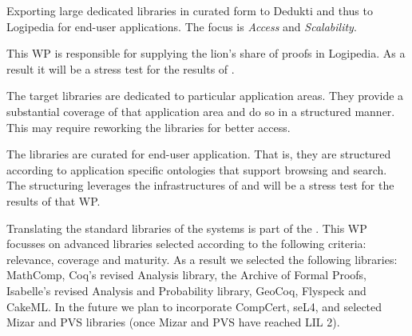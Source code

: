 \begin{workpackage}[id=libraries,type=RTD,wphases=1-48,
  short={Large libraries},%
  title={Large libraries},
  activity=na,
  lead=Tum,
  StrRM=18,
  ChaRM=12,
  TumRM=27]

\begin{wpobjectives}
Exporting large dedicated libraries in
curated form to Dedukti and thus to Logipedia for end-user applications.
The focus is \emph{Access} and \emph{Scalability}.
\begin{compactitem}
\item This WP is responsible for supplying the lion's share of proofs in
Logipedia.  As a result it will be a stress test for the results of .

\item The target libraries are dedicated to particular application
areas. They provide a substantial coverage of that application area
and do so in a structured manner. This may require reworking the
libraries for better access.

\item The libraries are curated for end-user application. That is, they
are structured according to application specific ontologies that
support browsing and search. The structuring leverages the
infrastructures of  and will be a
stress test for the results of that WP.
\end{compactitem}
\end{wpobjectives}


\begin{wpdescription}
Translating the standard libraries of the systems is part of the .
This WP focusses on advanced libraries selected according to the following criteria:
relevance, coverage and maturity.
As a result we selected the following libraries: MathComp, Coq's revised
Analysis library, the Archive of Formal Proofs, Isabelle's revised Analysis and Probability library,
GeoCoq, Flyspeck and CakeML. In the future we plan to incorporate
CompCert, seL4, and selected Mizar and PVS libraries (once Mizar and
PVS have reached LIL 2).
\end{wpdescription}


\begin{tasklist}


\end{tasklist}
\end{workpackage}
